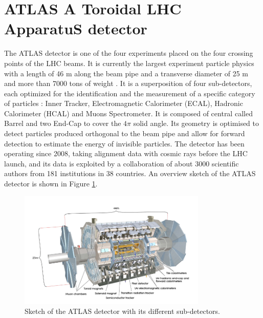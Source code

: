 \section{ATLAS A Toroidal LHC ApparatuS detector}
\label{chap2:ATLAS}
The ATLAS detector is one of the four experiments placed on the four crossing points of the LHC beams. It is currently the largest experiment particle physics with a length of 46 m along the beam pipe and a transverse diameter of 25 m and more than 7000 tons of weight \cite{ATLAS_Exp}. It is a superposition of four sub-detectors, each optimized for the identification and the measurement of a specific category of particles : Inner Tracker, Electromagnetic Calorimeter (ECAL), Hadronic Calorimeter (HCAL) and Muons Spectrometer. It is composed of central called Barrel and two End-Cap to cover the $4\pi$ solid angle. Its geometry is optimised to detect particles produced orthogonal to the beam pipe and allow for forward detection to estimate the energy of invisible particles. The detector has been operating since 2008, taking alignment data with cosmic rays before the LHC launch, and its data is exploited by a collaboration of about 3000 scientific authors from 181 institutions in 38 countries. An overview sketch of the ATLAS detector is shown in Figure \ref{fig:chap2:ATLAS:Img}.
\begin{figure}[htbp]
    \centering
    \includegraphics[width=0.8\textwidth]{Ch2/Img/ATLAS_sketch.png}
    \caption{Sketch of the ATLAS detector with its different sub-detectors.}
    \label{fig:chap2:ATLAS:Img}
\end{figure}

